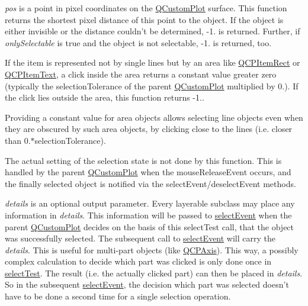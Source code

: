 {\itshape pos} is a point in pixel coordinates on the \hyperlink{class_q_custom_plot}{Q\-Custom\-Plot} surface. This function returns the shortest pixel distance of this point to the object. If the object is either invisible or the distance couldn't be determined, -\/1. is returned. Further, if {\itshape only\-Selectable} is true and the object is not selectable, -\/1. is returned, too.

If the item is represented not by single lines but by an area like \hyperlink{class_q_c_p_item_rect}{Q\-C\-P\-Item\-Rect} or \hyperlink{class_q_c_p_item_text}{Q\-C\-P\-Item\-Text}, a click inside the area returns a constant value greater zero (typically the selection\-Tolerance of the parent \hyperlink{class_q_custom_plot}{Q\-Custom\-Plot} multiplied by 0.). If the click lies outside the area, this function returns -\/1..

Providing a constant value for area objects allows selecting line objects even when they are obscured by such area objects, by clicking close to the lines (i.\-e. closer than 0.$\ast$selection\-Tolerance).

The actual setting of the selection state is not done by this function. This is handled by the parent \hyperlink{class_q_custom_plot}{Q\-Custom\-Plot} when the mouse\-Release\-Event occurs, and the finally selected object is notified via the select\-Event/deselect\-Event methods.

{\itshape details} is an optional output parameter. Every layerable subclass may place any information in {\itshape details}. This information will be passed to \hyperlink{class_q_c_p_abstract_plottable_a16aaad02456aa23a759efd1ac90c79bf}{select\-Event} when the parent \hyperlink{class_q_custom_plot}{Q\-Custom\-Plot} decides on the basis of this select\-Test call, that the object was successfully selected. The subsequent call to \hyperlink{class_q_c_p_abstract_plottable_a16aaad02456aa23a759efd1ac90c79bf}{select\-Event} will carry the {\itshape details}. This is useful for multi-\/part objects (like \hyperlink{class_q_c_p_axis}{Q\-C\-P\-Axis}). This way, a possibly complex calculation to decide which part was clicked is only done once in \hyperlink{class_q_c_p_statistical_box_a7d3ac843dc48a085740fdfc4319a89cc}{select\-Test}. The result (i.\-e. the actually clicked part) can then be placed in {\itshape details}. So in the subsequent \hyperlink{class_q_c_p_abstract_plottable_a16aaad02456aa23a759efd1ac90c79bf}{select\-Event}, the decision which part was selected doesn't have to be done a second time for a single selection operation.

